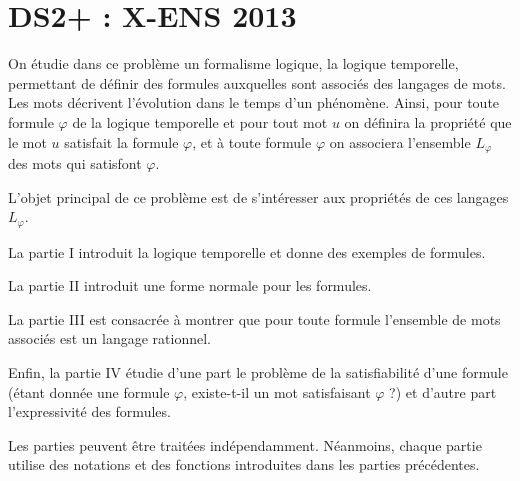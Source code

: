
\chapter{DS2+ : X-ENS 2013}

On étudie dans ce problème un formalisme logique, la logique temporelle, permettant de définir des formules auxquelles
sont associés des langages de mots. Les mots décrivent l'évolution dans le temps d'un phénomène. Ainsi, pour toute formule $\varphi$ de la logique temporelle et pour tout mot $u$ on définira la
propriété que le mot $u$ satisfait la formule $\varphi$, et à toute formule $\varphi$ on associera l’ensemble $L_\varphi$ des mots qui satisfont $\varphi$.

L’objet principal de ce problème est de s’intéresser aux propriétés de ces langages $L_\varphi$.

La partie I introduit la logique temporelle et donne des exemples de formules. 

La partie II introduit une forme normale pour les formules. 

La partie III est consacrée à montrer que pour toute formule l’ensemble de mots associés est un langage
rationnel. 

Enfin, la partie IV étudie d’une part le problème de la satisfiabilité d’une formule (étant donnée une formule $\varphi$,
existe-t-il un mot satisfaisant $\varphi$ ?) et d’autre part l’expressivité des formules.


Les parties peuvent être traitées indépendamment. Néanmoins, chaque partie utilise des notations et des fonctions
introduites dans les parties précédentes.
